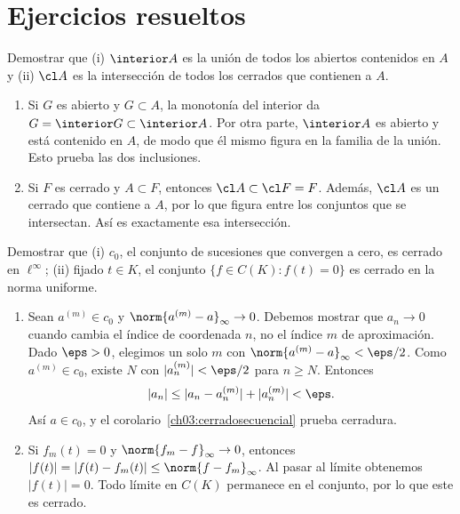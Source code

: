 \section{Ejercicios resueltos}
\begin{ejercicio}
Demostrar que (i) $\interior A$ es la unión de todos los abiertos contenidos en $A$ y (ii) $\cl A$ es la intersección de todos los cerrados que contienen a $A$.
\end{ejercicio}
\begin{solucion}
\begin{enumerate}[label=(\roman*)]
\item Si $G$ es abierto y $G\subset A$, la monotonía del interior da $G=\interior G\subset\interior A$. Por otra parte, $\interior A$ es abierto y está contenido en $A$, de modo que él mismo figura en la familia de la unión. Esto prueba las dos inclusiones.
\item Si $F$ es cerrado y $A\subset F$, entonces $\cl A\subset\cl F=F$. Además, $\cl A$ es un cerrado que contiene a $A$, por lo que figura entre los conjuntos que se intersectan. Así es exactamente esa intersección.
\end{enumerate}
\end{solucion}

\begin{ejercicio}
Demostrar que (i) $c_0$, el conjunto de sucesiones que convergen a cero, es cerrado en $\ell^\infty$; (ii) fijado $t\in K$, el conjunto $\{f\in C(K):f(t)=0\}$ es cerrado en la norma uniforme.
\end{ejercicio}
\begin{solucion}
\begin{enumerate}[label=(\roman*)]
\item Sean $a^{(m)}\in c_0$ y $\norm{a^{(m)}-a}_\infty\to0$. Debemos mostrar que $a_n\to0$ cuando cambia el índice de coordenada $n$, no el índice $m$ de aproximación. Dado $\eps>0$, elegimos un solo $m$ con $\norm{a^{(m)}-a}_\infty<\eps/2$. Como $a^{(m)}\in c_0$, existe $N$ con $|a^{(m)}_n|<\eps/2$ para $n\ge N$. Entonces
\[
|a_n|\le |a_n-a^{(m)}_n|+|a^{(m)}_n|<\eps.
\]
Así $a\in c_0$, y el corolario~\ref{ch03:cerradosecuencial} prueba cerradura.
\item Si $f_m(t)=0$ y $\norm{f_m-f}_\infty\to0$, entonces $|f(t)|=|f(t)-f_m(t)|\le\norm{f-f_m}_\infty$. Al pasar al límite obtenemos $|f(t)|=0$. Todo límite en $C(K)$ permanece en el conjunto, por lo que este es cerrado.
\end{enumerate}
\end{solucion}

